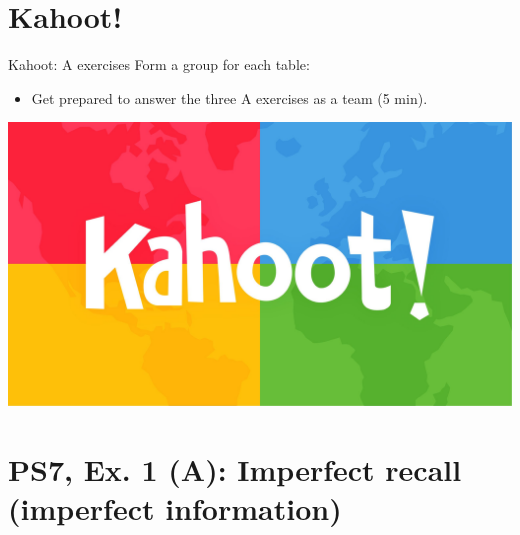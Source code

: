 \section{Kahoot!}

\begin{frame}{Kahoot: A exercises}
  Form a group for each table:
  \begin{itemize}
    \item Get prepared to answer the three A exercises as a team (5 min).
  \end{itemize}
  \includegraphics[width=\textwidth]{figures/kahoot}
\end{frame}


\section{PS7, Ex. 1 (A): Imperfect recall (imperfect information)}

